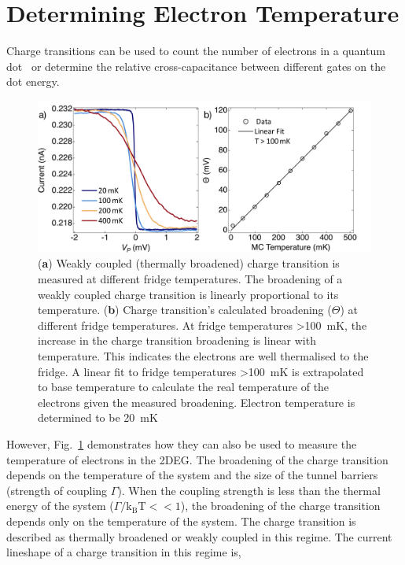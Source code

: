 \section{Determining Electron Temperature}



Charge transitions can be used to count the number of electrons in a quantum dot~\cite{electron_counting} or determine the relative cross-capacitance between different gates on the dot energy.

\begin{figure}[!htb]
 \begin{center}
 \includegraphics[width=1.0\textwidth]{figures/ch1/figure7.pdf}
 \caption[Determining Electron Temperature]{\label{fig:ch1/electron_temp} 
 (\textbf{a}) Weakly coupled (thermally broadened) charge transition is measured at different fridge temperatures. The broadening of a weakly coupled charge transition is linearly proportional to its temperature. (\textbf{b}) Charge transition's calculated broadening ($\Theta$) at different fridge temperatures. At fridge temperatures \qty{>100}{mK}, the increase in the charge transition broadening is linear with temperature. This indicates the electrons are well thermalised to the fridge. A linear fit to fridge temperatures \qty{>100}{mK} is extrapolated to base temperature to calculate the real temperature of the electrons given the measured broadening. Electron temperature is determined to be \qty{20}{mK}
 }
 \end{center}
\end{figure}



However, Fig.~\ref{fig:ch1/electron_temp} demonstrates how they can also be used to measure the temperature of electrons in the 2DEG. The broadening of the charge transition depends on the temperature of the system and the size of the tunnel barriers (strength of coupling $\Gamma$). When the coupling strength is less than the thermal energy of the system ($\Gamma/\mathrm{k_BT} << 1$), the broadening of the charge transition depends only on the temperature of the system. The charge transition is described as thermally broadened or weakly coupled in this regime. The current lineshape of a charge transition in this regime is,


